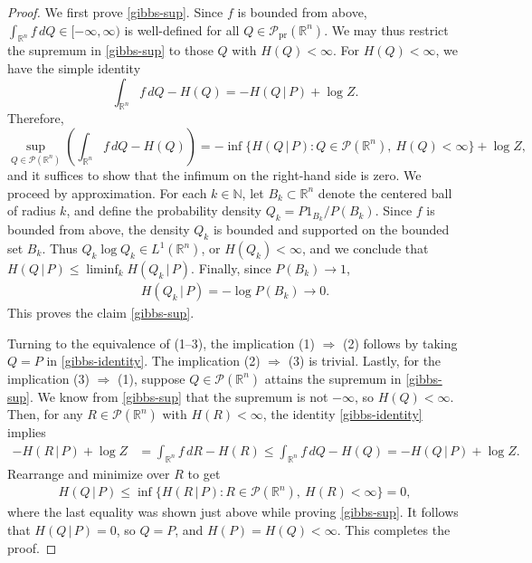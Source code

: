 \documentclass[11pt,reqno]{amsart}
\numberwithin{equation}{section}
\theoremstyle{definition}
\def\R{{\mathbb R}}
\def\N{{\mathbb N}}
\def\P{{\mathcal P}}
\def\Pprod{\P_{\mathrm{pr}}}
\begin{document}
\begin{proof} 
We first prove \eqref{gibbs-sup}. Since $ f $ is bounded from above, $ \int_{\R^n} f \, dQ \in [-\infty, \infty)$ is well-defined for all $ Q \in \Pprod(\R^n) $. 
We may thus restrict the supremum in \eqref{gibbs-sup} to those $Q$ with $H(Q) < \infty$. For $H(Q) < \infty$, we have the simple identity
\begin{equation}
\int_{\R^n} f \, dQ  - H(Q) = - H(Q \, |\, P) + \log Z.  \label{gibbs-identity}
\end{equation}
Therefore, 
\begin{equation*}
	\sup_{Q \in \P(\R^n) } \left( \int_{\R^n} f \,dQ - H(Q)\right)  = - \inf\Big\{H(Q\,|\,P) : Q \in \P(\R^n), \ H(Q) < \infty\Big\} + \log Z,  \label{gibbs-identity-2}
\end{equation*}
and it suffices to show that the infimum on the right-hand side is zero. We proceed by approximation. For each $k \in \N$, let $B_k \subset \R^n$ denote the centered ball of radius $k$, and define the probability density $Q_k = P1_{B_k}/P(B_k)$. Since $f$ is bounded from above, the density $Q_k$ is bounded and supported on the bounded set $B_k$. Thus $Q_k\log Q_k \in L^1(\R^n)$, or $H(Q_k) < \infty$, and we conclude that $H(Q\,|\,P) \le \liminf_k H(Q_k\,|\,P)$. Finally, since $P(B_k) \to 1$, 
\begin{align*}
	H(Q_k\,|\,P) = -\log P(B_k) \to 0.
\end{align*}
This proves the claim \eqref{gibbs-sup}.

Turning to the equivalence of (1--3), the implication (1) $ \Rightarrow $ (2) follows by taking $ Q = P $ in  \eqref{gibbs-identity}. The implication (2) $ \Rightarrow $ (3) is trivial. Lastly, for the implication (3) $ \Rightarrow $ (1), suppose $Q \in \P(\R^n)$ attains the supremum in \eqref{gibbs-sup}. We know from \eqref{gibbs-sup} that the supremum is not $ -\infty $, so $H(Q) < \infty$. Then, for any $R \in \P(\R^n)$ with $H(R) < \infty$, the identity \eqref{gibbs-identity} implies
\begin{align*}
	- H(R \, |\, P) + \log Z &= \int_{\R^n} f \, dR  - H(R) \le \int_{\R^n} f \, dQ  - H(Q) = - H(Q \, |\, P) + \log Z.
\end{align*}
Rearrange and minimize over $R$ to get
\begin{align*}
	H(Q\,|\,P) \le \inf\Big\{H(R\,|\,P) : R \in \P(\R^n), \ H(R) < \infty\Big\} = 0,
\end{align*}
where the last equality was shown just above while proving \eqref{gibbs-sup}. It follows that $H(Q\,|\,P)=0$, so $Q=P$, and $H(P)=H(Q)<\infty$. This completes the proof.

\end{proof}
\end{document}
